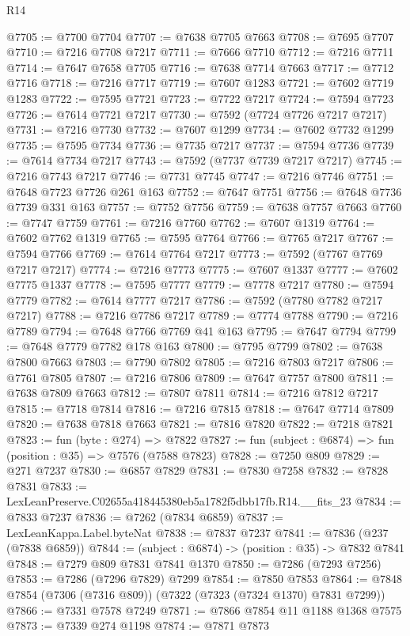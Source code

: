\begin{lexlean}{R14}
\begin{coremodule}
@7705 := @7700 @7704
@7707 := @7638 @7705 @7663
@7708 := @7695 @7707
@7710 := @7216 @7708 @7217
@7711 := @7666 @7710
@7712 := @7216 @7711
@7714 := @7647 @7658 @7705
@7716 := @7638 @7714 @7663
@7717 := @7712 @7716
@7718 := @7216 @7717
@7719 := @7607 @1283
@7721 := @7602 @7719 @1283
@7722 := @7595 @7721
@7723 := @7722 @7217
@7724 := @7594 @7723
@7726 := @7614 @7721 @7217
@7730 := @7592 (@7724 @7726 @7217 @7217)
@7731 := @7216 @7730
@7732 := @7607 @1299
@7734 := @7602 @7732 @1299
@7735 := @7595 @7734
@7736 := @7735 @7217
@7737 := @7594 @7736
@7739 := @7614 @7734 @7217
@7743 := @7592 (@7737 @7739 @7217 @7217)
@7745 := @7216 @7743 @7217
@7746 := @7731 @7745
@7747 := @7216 @7746
@7751 := @7648 @7723 @7726 @261 @163
@7752 := @7647 @7751
@7756 := @7648 @7736 @7739 @331 @163
@7757 := @7752 @7756
@7759 := @7638 @7757 @7663
@7760 := @7747 @7759
@7761 := @7216 @7760
@7762 := @7607 @1319
@7764 := @7602 @7762 @1319
@7765 := @7595 @7764
@7766 := @7765 @7217
@7767 := @7594 @7766
@7769 := @7614 @7764 @7217
@7773 := @7592 (@7767 @7769 @7217 @7217)
@7774 := @7216 @7773
@7775 := @7607 @1337
@7777 := @7602 @7775 @1337
@7778 := @7595 @7777
@7779 := @7778 @7217
@7780 := @7594 @7779
@7782 := @7614 @7777 @7217
@7786 := @7592 (@7780 @7782 @7217 @7217)
@7788 := @7216 @7786 @7217
@7789 := @7774 @7788
@7790 := @7216 @7789
@7794 := @7648 @7766 @7769 @41 @163
@7795 := @7647 @7794
@7799 := @7648 @7779 @7782 @178 @163
@7800 := @7795 @7799
@7802 := @7638 @7800 @7663
@7803 := @7790 @7802
@7805 := @7216 @7803 @7217
@7806 := @7761 @7805
@7807 := @7216 @7806
@7809 := @7647 @7757 @7800
@7811 := @7638 @7809 @7663
@7812 := @7807 @7811
@7814 := @7216 @7812 @7217
@7815 := @7718 @7814
@7816 := @7216 @7815
@7818 := @7647 @7714 @7809
@7820 := @7638 @7818 @7663
@7821 := @7816 @7820
@7822 := @7218 @7821
@7823 := fun (byte : @274) => @7822
@7827 := fun (subject : @6874) => fun (position : @35) => @7576 (@7588 @7823)
@7828 := @7250 @809
@7829 := @271 @7237
@7830 := @6857 @7829
@7831 := @7830 @7258
@7832 := @7828 @7831
@7833 := LexLeanPreserve.C02655a418445380eb5a1782f5dbb17fb.R14.__fits_23
@7834 := @7833 @7237
@7836 := @7262 (@7834 @6859)
@7837 := LexLeanKappa.Label.byteNat
@7838 := @7837 @7237
@7841 := @7836 (@237 (@7838 @6859))
@7844 := (subject : @6874) -> (position : @35) -> @7832 @7841
@7848 := @7279 @809 @7831 @7841 @1370
@7850 := @7286 (@7293 @7256)
@7853 := @7286 (@7296 @7829) @7299
@7854 := @7850 @7853
@7864 := @7848 @7854 (@7306 (@7316 @809)) (@7322 (@7323 (@7324 @1370) @7831 @7299))
@7866 := @7331 @7578 @7249
@7871 := @7866 @7854 @11 @1188 @1368 @7575
@7873 := @7339 @274 @1198
@7874 := @7871 @7873

\end{coremodule}
\end{lexlean}
